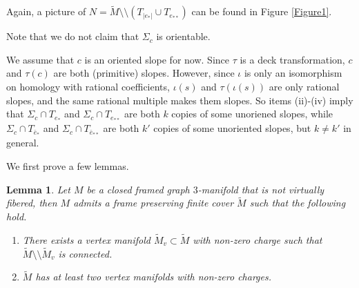 \documentclass{amsart}
\numberwithin{equation}{section}
\newtheorem{lemma}[theorem]{Lemma}
\theoremstyle{definition}
\begin{document}
Again, a picture of $N=\tilde{M}\setminus \setminus (T_{|e_*|}\cup T_{e_{**}})$ can be found in Figure \ref{Figure1}. 

Note that we do not claim that $\Sigma_c$ is orientable.

We assume that $c$ is an oriented slope for now. Since $\tau$ is a deck transformation, $c$ and $\tau(c)$ are both (primitive) slopes. However, since $\iota$ is only an isomorphism on homology with rational coefficients, $\iota(s)$ and $\tau(\iota(s))$ are only rational slopes, and the same rational multiple makes them slopes. So items (ii)-(iv) imply that $\Sigma_c\cap T_{e_*}$ and $\Sigma_c\cap T_{e_{**}}$ are both $k$ copies of some unoriened slopes, while $\Sigma_c\cap T_{\bar{e}_*}$ and $\Sigma_c\cap T_{\bar{e}_{**}}$ are both $k'$ copies of some unoriented slopes, but $k\ne k'$ in general.



We first prove a few lemmas.

\begin{lemma}\label{firstcover}
Let $M$ be a closed framed graph $3$-manifold that is not virtually fibered, then $M$ admits a frame preserving finite cover $\tilde{M}$ such that the following hold.
\begin{enumerate}
\item There exists a vertex manifold $\tilde{M}_v\subset \tilde{M}$ with non-zero charge such that $\tilde{M}\setminus\setminus \tilde{M}_v$ is connected.
\item $\tilde{M}$ has at least two vertex manifolds with non-zero charges.
\end{enumerate}
\end{lemma}
\end{document}
